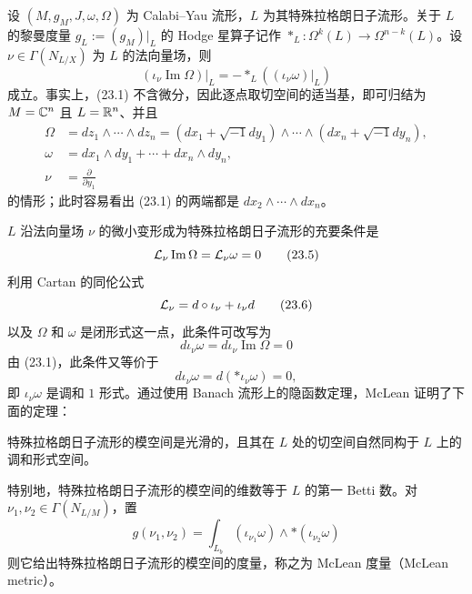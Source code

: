 设 $(M, g_M, J, \omega, \Omega)$ 为 Calabi--Yau 流形，$L$ 为其特殊拉格朗日子流形。关于 $L$ 的黎曼度量 $g_L := (g_M)|_{L}$ 的 Hodge 星算子记作 $*_{L} : \Omega^{k}(L) \to \Omega^{n-k}(L)$。设 $\nu \in \Gamma(N_{L/X})$ 为 $L$ 的法向量场，则
\begin{equation}
(\iota_{\nu}\operatorname{Im}\Omega)\big|_{L} = -*_{L}\left((\iota_{\nu}\omega)\big|_{L}\right) \tag{23.1}
\end{equation}
成立。事实上，(23.1) 不含微分，因此逐点取切空间的适当基，即可归结为 $M = \mathbb{C}^{n}$ 且 $L = \mathbb{R}^{n}$、并且
\begin{align}
\Omega &= dz_1 \wedge \cdots \wedge dz_n = (dx_1 + \sqrt{-1}dy_1) \wedge \cdots \wedge (dx_n + \sqrt{-1}dy_n), \tag{23.2}\\
\omega &= dx_1 \wedge dy_1 + \cdots + dx_n \wedge dy_n, \tag{23.3}\\
\nu &= \frac{\partial}{\partial y_1} \tag{23.4}
\end{align}
的情形；此时容易看出 (23.1) 的两端都是 $dx_2 \wedge \cdots \wedge dx_n$。

$L$ 沿法向量场 $\nu$ 的微小变形成为特殊拉格朗日子流形的充要条件是
\begin{equation}
\mathcal{L}_{\nu}\operatorname{Im}\Omega = \mathcal{L}_{\nu}\omega = 0 \tag{23.5}
\end{equation}
利用 Cartan 的同伦公式
\begin{equation}
\mathcal{L}_{\nu} = d \circ \iota_{\nu} + \iota_{\nu}d \tag{23.6}
\end{equation}
以及 $\Omega$ 和 $\omega$ 是闭形式这一点，此条件可改写为
\begin{equation}
d\iota_{\nu}\omega = d\iota_{\nu}\operatorname{Im}\Omega = 0 \tag{23.7}
\end{equation}
由 (23.1)，此条件又等价于
\begin{equation}
d\iota_{\nu}\omega = d(*\iota_{\nu}\omega) = 0, \tag{23.8}
\end{equation}
即 $\iota_{\nu}\omega$ 是调和 $1$ 形式。通过使用 Banach 流形上的隐函数定理，McLean 证明了下面的定理：

\begin{theorem}
特殊拉格朗日子流形的模空间是光滑的，且其在 $L$ 处的切空间自然同构于 $L$ 上的调和形式空间。
\end{theorem}

特别地，特殊拉格朗日子流形的模空间的维数等于 $L$ 的第一 Betti 数。对 $\nu_1, \nu_2 \in \Gamma(N_{L/M})$，置
\begin{equation}
g(\nu_1, \nu_2) = \int_{L_b}(\iota_{\nu_1}\omega) \wedge *(\iota_{\nu_2}\omega) \tag{23.9}
\end{equation}
则它给出特殊拉格朗日子流形的模空间的度量，称之为 McLean 度量（McLean metric）。

